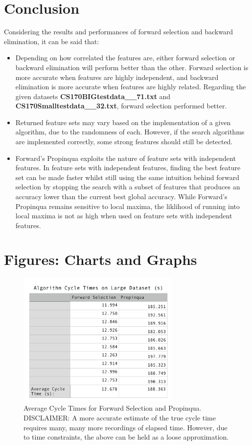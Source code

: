 \documentclass{article}
\begin{document}
\section{Conclusion}
Considering the results and performances of forward selection and backward
elimination, it can be said that:
\begin{itemize}
\item Depending on how correlated the features are, either forward selection
  or backward elimination will perform better than the other. Forward
  selection is more accurate when features are highly independent, and
  backward elimination is more accurate when features are highly related.
  Regarding the given datasets \textbf{CS170BIGtestdata\_\_71.txt} and
  \textbf{CS170Smalltestdata\_\_32.txt}, forward selection performed better.
\item Returned feature sets may vary based on the implementation of a given
  algorithm, due to the randomness of each. However, if the search algorithms
  are implemented correctly, some strong features should still be detected.
\item Forward's Propinqua exploits the nature of feature sets with independent
  features. In feature sets with independent features, finding the best feature
  set can be made faster whilst still using the same intuition behind forward
  selection by stopping the search with a subset of features that produces an
  accuracy lower than the current best global accuracy. While Forward's
  Propinqua remains sensitive to local maxima, the liklihood of running into
  local maxima is not as high when used on feature sets with independent features.
 
\end{itemize}

\section{Figures: Charts and Graphs}

\begin{figure}[!h]
  \centering
  \includegraphics[width=8cm,keepaspectratio]{AvgCycleTime.png}
  \caption{Average Cycle Times for Forward Selection and Propinqua. DISCLAIMER: A more accurate estimate of the true cycle time requires many, many more
recordings of elapsed time. However, due to time constraints, the above can be
held as a loose approximation.}
\end{figure}
\end{document}
